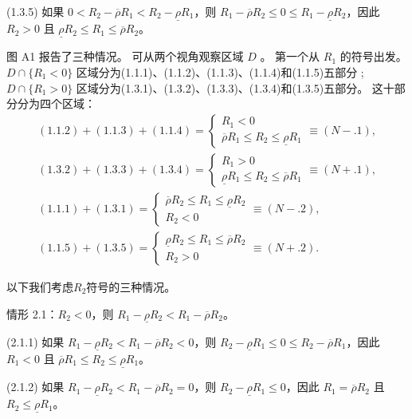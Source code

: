 \documentclass[10.0pt]{article}
\begin{document}
(1.3.5) 如果 $ 0 < R_2 - \overline{\rho} R_1 < R_2 - \underline{\rho} R_1 $，则 $ R_1 - \overline{\rho} R_2 \leqslant 0 \leqslant R_1 - \underline {\rho} R_2 $，因此 $ R_2 > 0 $ 且 $ \underline{\rho} R_2 \leqslant R_1 \leqslant \overline{\rho} R_2 $。



图 A1 报告了三种情况。 可从两个视角观察区域 $D$ 。 第一个从 $ R_1 $ 的符号出发。 $ D \cap \{ R_1 < 0 \} $ 区域分为(1.1.1)、(1.1.2)、(1.1.3)、(1.1.4)和(1.1.5)五部分 ; $ D \cap \{ R_1 > 0 \} $ 区域分为(1.3.1)、(1.3.2)、(1.3.3)、(1.3.4)和(1.3.5)五部分。 这十部分分为四个区域：
\begin{eqnarray*}
& (1.1.2) + (1.1.3) + (1.1.4) = \left\{ \begin{matrix} R_1 < 0 \\ \overline{\rho} R_1 \leqslant R_2 \leqslant \underline{\rho} R_1 \end{matrix} \right. \equiv (N-.1), & \\
& (1.3.2) + (1.3.3) + (1.3.4) = \left\{ \begin{matrix} R_1 > 0 \\ \underline{\rho} R_1 \leqslant R_2 \leqslant \overline{\rho} R_1 \end{matrix} \right. \equiv (N+.1), & \\
& (1.1.1) + (1.3.1) = \left\{ \begin{matrix} \overline{\rho} R_2 \leqslant R_1 \leqslant \underline{\rho} R_2 \\ R_2 < 0 \end{matrix} \right. \equiv (N-.2), & \\
& (1.1.5) + (1.3.5) = \left\{ \begin{matrix} \underline{\rho} R_2 \leqslant R_1 \leqslant \overline{\rho} R_2 \\ R_2 > 0 \end{matrix} \right. \equiv (N+.2). &
\end{eqnarray*}


以下我们考虑$R_2$符号的三种情况。

情形 2.1：$ R_2 < 0 $，则 $ R_1 - \underline{\rho} R_2 < R_1 - \overline{\rho} R_2 $。

(2.1.1) 如果 $ R_1 - \underline{\rho} R_2 < R_1 - \overline{\rho} R_2 < 0 $，则 $ R_2 - \underline{\rho} R_1 \leqslant 0 \leqslant R_2 - \overline {\rho} R_1 $，因此 $ R_1 < 0 $ 且 $ \overline{\rho} R_1 \leqslant R_2 \leqslant \underline{\rho} R_1 $。

(2.1.2) 如果 $ R_1 - \underline{\rho} R_2 < R_1 - \overline{\rho} R_2 = 0 $，则 $ R_2 - \underline{\rho} R_1 \leqslant 0 $，因此 $ R_1 = \overline{\rho} R_2 $ 且 $ R_2 \leqslant \underline{\rho} R_1 $。
\end{document}
